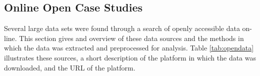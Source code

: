 \subsection{Online Open Case Studies}
\label{openonlinecasestudies}

Several large data sets were found through a search of openly accessible data on-line. This section gives and overview of these data sources and the methods in which the data was extracted and preprocessed for analysis. Table \ref{tab:opendata} illustrates these sources, a short description of the platform in which the data was downloaded, and the URL of the platform.

